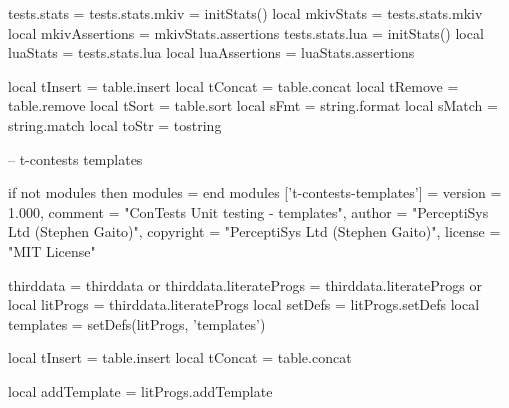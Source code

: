 tests.stats          = {}
tests.stats.mkiv     = initStats()
local mkivStats      = tests.stats.mkiv
local mkivAssertions = mkivStats.assertions
tests.stats.lua      = initStats()
local luaStats       = tests.stats.lua
local luaAssertions  = luaStats.assertions

local tInsert = table.insert
local tConcat = table.concat
local tRemove = table.remove
local tSort   = table.sort
local sFmt    = string.format
local sMatch  = string.match
local toStr   = tostring
\stopLuaCode

\startLuaTemplate
-- t-contests templates

if not modules then modules = { } end
modules ['t-contests-templates'] = {
    version   = 1.000,
    comment   = "ConTests Unit testing - templates",
    author    = "PerceptiSys Ltd (Stephen Gaito)",
    copyright = "PerceptiSys Ltd (Stephen Gaito)",
    license   = "MIT License"
}

thirddata               = thirddata               or {}
thirddata.literateProgs = thirddata.literateProgs or {}
local litProgs          = thirddata.literateProgs
local setDefs           = litProgs.setDefs
local templates         = setDefs(litProgs, 'templates')

local tInsert = table.insert
local tConcat = table.concat

local addTemplate = litProgs.addTemplate
\stopLuaTemplate

\stopchapter
